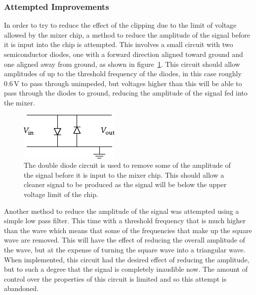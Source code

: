 \subsubsection{Attempted Improvements}
In order to try to reduce the effect of the clipping due to the limit of voltage allowed by the mixer chip, a method to reduce the amplitude of the signal before it is input into the chip is attempted. This involves a small circuit with two semiconductor diodes, one with a forward direction aligned toward ground and one aligned away from ground, as shown in figure~\ref{fig:diodes}. This circuit should allow amplitudes of up to the threshold frequency of the diodes, in this case roughly 0.6\,V to pass through unimpeded, but voltages higher than this will be able to pass through the diodes to ground, reducing the amplitude of the signal fed into the mixer.

\begin{figure}[htbp]
	\centering
	\includegraphics[scale=1.2]{report_img/diodes} 
		\caption{The double diode circuit is used to remove some of the amplitude of the signal before it is input to the mixer chip. This should allow a cleaner signal to be produced as the signal will be below the upper voltage limit of the chip.}
		\label{fig:diodes}
\end{figure} 

Another method to reduce the amplitude of the signal was attempted using a simple low pass filter. This time with a threshold frequency that is much higher than the wave which means that some of the frequencies that make up the square wave are removed. This will have the effect of reducing the overall amplitude of the wave, but at the expense of turning the square wave into a triangular wave. When implemented, this circuit had the desired effect of reducing the amplitude, but to such a degree that the signal is completely inaudible now. The amount of control over the properties of this circuit is limited and so this attempt is abandoned. 

